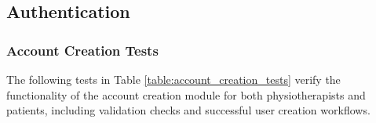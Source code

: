 \documentclass[12pt, titlepage]{article}
\begin{document}
\newcommand{\testcount}{\stepcounter{testcase}\thetestcase}
\renewcommand{\arraystretch}{1.2} %

\subsection{Authentication}

\subsubsection{Account Creation Tests}
The following tests in Table \ref{table:account_creation_tests} verify the functionality of the account 
creation module for both physiotherapists and patients, including validation checks and successful user 
creation workflows.

\setlength{\tabcolsep}{4pt}
\renewcommand{\arraystretch}{1.15}
\setlength{\LTleft}{0pt}
\setlength{\LTright}{0pt}
\end{document}
